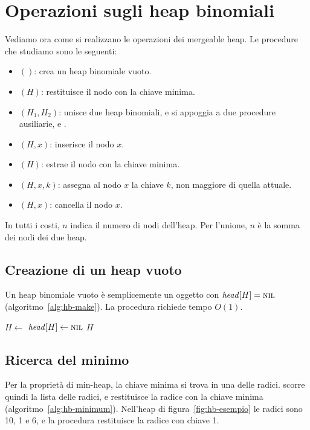 \section{Operazioni sugli heap binomiali}\label{sec:hb-op}
Vediamo ora come si realizzano le operazioni dei mergeable heap. Le procedure che studiamo sono le seguenti:
\begin{itemize}
    \item \MakeBinomialHeap$()$: crea un heap binomiale vuoto.
    \item \BinomialHeapMinimum$(H)$: restituisce il nodo con la chiave minima.
    \item \BinomialHeapUnion$(H_1,H_2)$: unisce due heap binomiali, e si appoggia a due procedure ausiliarie, \BinomialLink{} e \BinomialHeapMerge{}.
    \item \BinomialHeapInsert$(H,x)$: inserisce il nodo $x$.
    \item \BinomialHeapExtractMin$(H)$: estrae il nodo con la chiave minima.
    \item \BinomialHeapDecreaseKey$(H,x,k)$: assegna al nodo $x$ la chiave $k$, non maggiore di quella attuale.
    \item \BinomialHeapDelete$(H,x)$: cancella il nodo $x$.
\end{itemize}
In tutti i costi, $n$ indica il numero di nodi dell'heap. Per l'unione, $n$ è la somma dei nodi dei due heap.

\subsection{Creazione di un heap vuoto}\label{sec:hb-make}
Un heap binomiale vuoto è semplicemente un oggetto con $\mathit{head}[H] = \textsc{nil}$ (algoritmo~\ref{alg:hb-make}). La procedura richiede tempo $O(1)$.

\begin{algorithm}[htbp]
\caption{La creazione di un heap binomiale vuoto.}\label{alg:hb-make}
\begin{algorithmic}[1]
  \State $H \gets$ 
  \State $\mathit{head}[H] \gets \textsc{nil}$
  \State \Return $H$
\EndProcedure
\end{algorithmic}
\end{algorithm}

\subsection{Ricerca del minimo}\label{sec:hb-minimum}
Per la proprietà di min-heap, la chiave minima si trova in una delle radici. \BinomialHeapMinimum{} scorre quindi la lista delle radici, e restituisce la radice con la chiave minima (algoritmo~\ref{alg:hb-minimum}). Nell'heap di figura~\ref{fig:hb-esempio} le radici sono 10, 1 e 6, e la procedura restituisce la radice con chiave 1.

